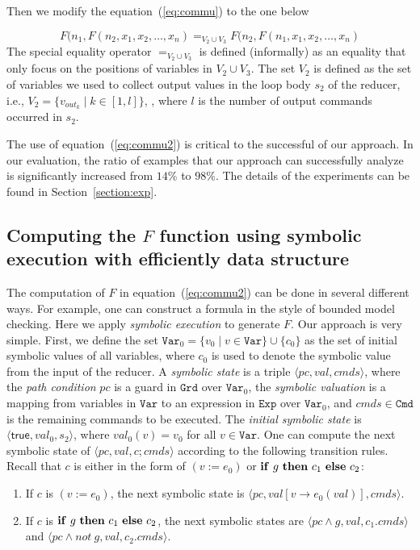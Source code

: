 \documentclass{llncs}
\newcommand{\Var}{\mathtt{Var}}
\newcommand{\Exp}{\mathtt{Exp}}
\newcommand{\Cmd}{\mathtt{Cmd}}
\newcommand{\Grd}{\mathtt{Grd}}
\newcommand{\true}{\mathsf{true}}
\newcommand{\ite}[3]{
	 \ifmmode 
	 \mathbf{if}\ #1 \ \mathbf{then}\ #2\  \mathbf{else}\ #3 
	 \else
	 \textbf{if}\ #1 \ \textbf{then}\ #2\  \textbf{else}\ #3
	 \fi}
\begin{document}
Then we modify the equation~(\ref{eq:commu}) to the one below

\begin{equation}
F(n_1, F(n_2,x_1,x_2,\ldots,x_n) =_{V_2\cup V_3} F(n_2, F(n_1,x_1,x_2,\ldots,x_n) 
\label{eq:commu2}
\end{equation}
The special equality operator $=_{V_2\cup V_3}$ is defined (informally) as an equality that only focus on the positions of variables in $V_2\cup V_3$.
The set $V_2$ is defined as the set of variables we used to collect output values in the loop body $s_2$ of the reducer, i.e., $V_2= \{v_{out_k} \mid k \in [1,l]\}$, , where $l$ is the number of output commands occurred in $s_2$.

The use of equation~(\ref{eq:commu2}) is critical to the successful of our approach. In our evaluation, the ratio of examples that our approach can successfully analyze is significantly increased from $14\%$ to $98\%$. The details of the experiments can be found in Section~\ref{section:exp}.

\subsection{Computing the $F$ function using symbolic execution with efficiently data structure}
The computation of $F$ in equation~(\ref{eq:commu2}) can be done in several different ways. For example, one can construct a formula in the style of bounded model checking. Here we apply \emph{symbolic execution} to generate $F$. Our approach is very simple. First, we define the set $\Var_0=\{v_0 \mid v \in \Var \}\cup \{c_0\}$ as the set of initial symbolic values of all variables, where $c_0$ is used to denote the symbolic value from the input of the reducer.
A \emph{symbolic state} is a triple $\langle pc, val, cmds \rangle$, where the \emph{path condition} $pc$ is a guard in $\Grd$ over $\Var_0$, the \emph{symbolic valuation} is a mapping from variables in $\Var$ to an expression in $\Exp$ over $\Var_0$, and $cmds\in \Cmd$ is the remaining commands to be executed. The \emph{initial symbolic state} is $\langle \true, val_0, s_2\rangle$, where $val_0(v) = v_0$ for all $v\in\Var$. 
One can compute the next symbolic state of $\langle pc, val, c;cmds \rangle$ according to the following transition rules. Recall that $c$ is either in the form of $(v:= e_0)$ or $\ite{g}{c_1}{c_2}$:
\begin{enumerate}
	\item If $c$ is $(v:= e_0)$, the next symbolic state is $\langle pc, val[v \rightarrow e_0(val) ], cmds \rangle$.
	\item  If $c$ is $\ite{g}{c_1}{c_2}$, the next symbolic states are $\langle pc\wedge g, val, c_1.cmds \rangle$ and $\langle pc\wedge not\  g, val, c_2.cmds \rangle$. 
\end{enumerate}
\end{document}
